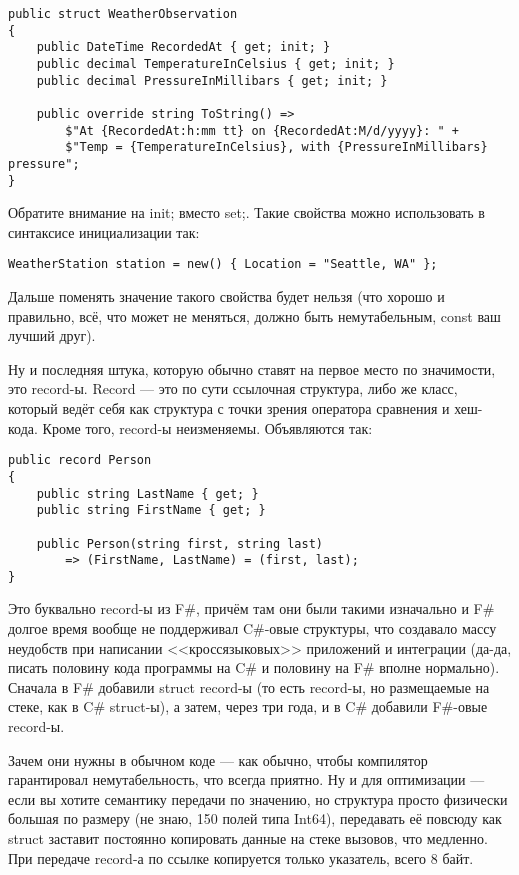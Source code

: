 \documentclass{../../text-style}
\begin{document}
\begin{verbatim}
public struct WeatherObservation
{
    public DateTime RecordedAt { get; init; }
    public decimal TemperatureInCelsius { get; init; }
    public decimal PressureInMillibars { get; init; }

    public override string ToString() =>
        $"At {RecordedAt:h:mm tt} on {RecordedAt:M/d/yyyy}: " +
        $"Temp = {TemperatureInCelsius}, with {PressureInMillibars} pressure";
}
\end{verbatim}

Обратите внимание на init; вместо set;. Такие свойства можно использовать в синтаксисе инициализации так:

\begin{verbatim}
WeatherStation station = new() { Location = "Seattle, WA" };
\end{verbatim}

Дальше поменять значение такого свойства будет нельзя (что хорошо и правильно, всё, что может не меняться, должно быть немутабельным, const ваш лучший друг).

Ну и последняя штука, которую обычно ставят на первое место по значимости, это record-ы. Record --- это по сути ссылочная структура, либо же класс, который ведёт себя как структура с точки зрения оператора сравнения и хеш-кода. Кроме того, record-ы неизменяемы. Объявляются так:

\begin{verbatim}
public record Person
{
    public string LastName { get; }
    public string FirstName { get; }

    public Person(string first, string last) 
        => (FirstName, LastName) = (first, last);
}
\end{verbatim}

Это буквально record-ы из F\#, причём там они были такими изначально и F\# долгое время вообще не поддерживал C\#-овые структуры, что создавало массу неудобств при написании <<кроссязыковых>> приложений и интеграции (да-да, писать половину кода программы на C\# и половину на F\# вполне нормально). Сначала в F\# добавили struct record-ы (то есть record-ы, но размещаемые на стеке, как в C\# struct-ы), а затем, через три года, и в C\# добавили F\#-овые record-ы.

Зачем они нужны в обычном коде --- как обычно, чтобы компилятор гарантировал немутабельность, что всегда приятно. Ну и для оптимизации --- если вы хотите семантику передачи по значению, но структура просто физически большая по размеру (не знаю, 150 полей типа Int64), передавать её повсюду как struct заставит постоянно копировать данные на стеке вызовов, что медленно. При передаче record-а по ссылке копируется только указатель, всего 8 байт.
\end{document}
